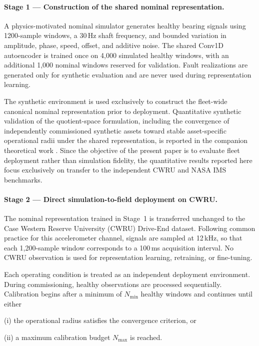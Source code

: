 \documentclass{trbunofficial}
\begin{document}
\paragraph{Stage 1 --- Construction of the shared nominal representation.}

A physics-motivated nominal simulator generates healthy bearing signals
using 1200-sample windows, a 30\,Hz shaft frequency, and bounded variation
in amplitude, phase, speed, offset, and additive noise.
The shared Conv1D autoencoder is trained once on 4,000 simulated healthy
windows, with an additional 1,000 nominal windows reserved for validation.
Fault realizations are generated only for synthetic evaluation and are never
used during representation learning.

The synthetic environment is used exclusively to construct the fleet-wide
canonical nominal representation prior to deployment. Quantitative synthetic
validation of the quotient-space formulation, including the convergence of
independently commissioned synthetic assets toward stable asset-specific
operational radii under the shared representation, is reported in the
companion theoretical work
\citep{disanti2026quotient,disanti2026inverse}. Since the objective of the
present paper is to evaluate fleet deployment rather than simulation
fidelity, the quantitative results reported here focus exclusively on
transfer to the independent CWRU and NASA IMS benchmarks.

\paragraph{Stage 2 --- Direct simulation-to-field deployment on CWRU.}

The nominal representation trained in Stage~1 is transferred unchanged to the
Case Western Reserve University (CWRU) Drive-End dataset. Following common
practice for this accelerometer channel, signals are sampled at 12\,kHz, so
that each 1,200-sample window corresponds to a 100\,ms acquisition interval.
No CWRU observation is used for representation learning, retraining, or
fine-tuning.

Each operating condition is treated as an independent deployment environment.
During commissioning, healthy observations are processed sequentially.
Calibration begins after a minimum of $N_{\min}$ healthy windows and continues
until either

(i) the operational radius satisfies the convergence criterion, or

(ii) a maximum calibration budget $N_{\max}$ is reached.
\end{document}
